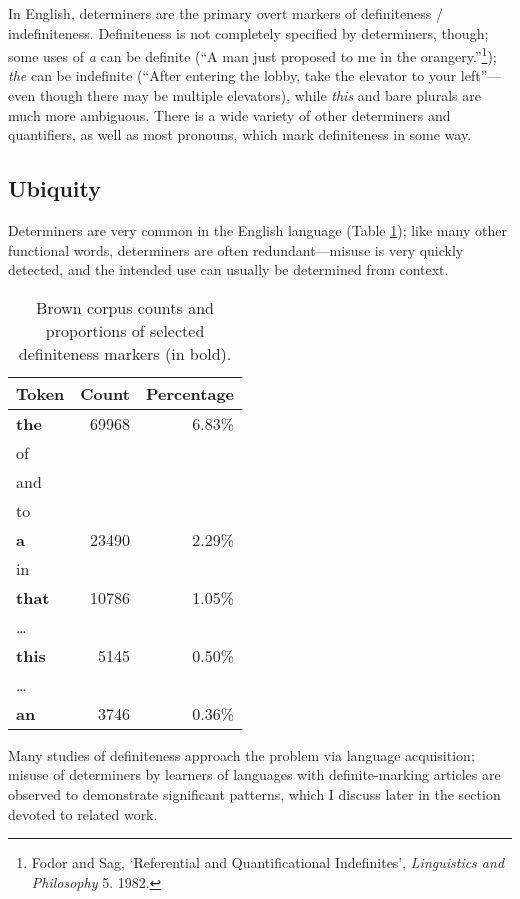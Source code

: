 \documentclass[11pt]{article}
\begin{document}
In English, determiners are the primary overt markers of definiteness / indefiniteness.
Definiteness is not completely specified by determiners, though; some uses of \emph{a} can be definite (``A man just proposed to me in the orangery.''\footnote{Fodor and Sag, `Referential and Quantificational Indefinites', \emph{Linguistics and Philosophy} 5. 1982.}); \emph{the} can be indefinite (``After entering the lobby, take the elevator to your left''---even though there may be multiple elevators), while \emph{this} and bare plurals are much more ambiguous. There is a wide variety of other determiners and quantifiers, as well as most pronouns, which mark definiteness in some way.

\subsection{Ubiquity}
Determiners are very common in the English language (Table \ref{tab:browncounts}); like many other functional words, determiners are often redundant---misuse is very quickly detected, and the intended use can usually be determined from context.
\begin{table}
  \centering
  \begin{tabular}{lrr}
    Token & Count & Percentage\\
    \toprule
    \textbf{the} & 69968 & 6.83\% \\
    of & &\\%
    and & &\\%
    to & &\\%
    \textbf{a} & 23490 & 2.29\% \\
    in & &\\%
    \textbf{that} & 10786 & 1.05\% \\
    \dots &       &          \\
    \textbf{this} & 5145 & 0.50\% \\
    \dots &       &          \\
    \textbf{an} & 3746 & 0.36\% \\
  \end{tabular}
  \caption{Brown corpus counts and proportions of selected definiteness markers (in bold).}
  \label{tab:browncounts}
\end{table}
Many studies of definiteness approach the problem via language acquisition; misuse of determiners by learners of languages with definite-marking articles are observed to demonstrate significant patterns, which I discuss later in the section devoted to related work.
\end{document}
